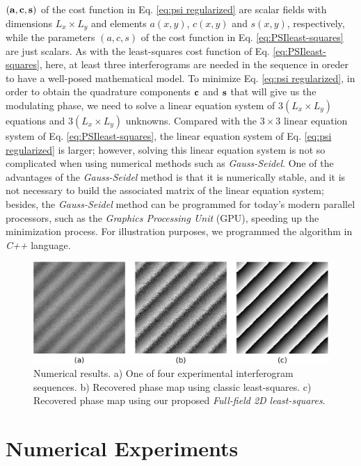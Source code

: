 $(\bf{a,c,s})$ of the cost function in Eq. \eqref{eq:psi regularized} are
scalar fields with dimensions $L_x\times L_y$ and elements $a(x,y)$,
$c(x,y)$ and $s(x,y)$, respectively, while the parameters
$(a,c,s)$ of the cost function in Eq. \eqref{eq:PSIleast-squares} are just scalars. As with the least-squares cost
function of Eq. \eqref{eq:PSIleast-squares}, here, at least three
interferograms are needed in the sequence in oreder to have a well-posed
mathematical model. To minimize Eq. \eqref{eq:psi regularized}, in
order to obtain the quadrature components $\bf c$ and $\bf s$ that
will give us the modulating phase, we need to solve a linear equation
system of $3(L_x\times L_y)$ equations and $3(L_x\times L_y)$
unknowns. Compared with the $3\times 3$ linear equation system of
Eq. \eqref{eq:PSIleast-squares}, the linear equation system of
Eq. \eqref{eq:psi regularized} is larger; however, solving this
linear equation system is not so complicated when using numerical
methods such as \emph{Gauss-Seidel}. One of the advantages of
the \emph{Gauss-Seidel} method is that it is numerically stable, and
it is not necessary to build the associated matrix of the linear
equation system; besides, the \emph{Gauss-Seidel} method can be
programmed for today's modern parallel processors, such as the
\emph{Graphics Processing Unit} (GPU), speeding up the minimization
process. For illustration purposes, we programmed the algorithm in
\emph{C++} language.
\begin{figure}[th!]
	\begin{center}
		\includegraphics[scale=0.25]{Chpt1_figures/Fig_1.eps}
	\end{center}
	\caption{Numerical results. a) One of four experimental 
	interferogram sequences. b) Recovered phase map using classic 
	least-squares. c) Recovered phase map using our proposed 
	\textit{Full-field 2D least-squares}.}
	\label{fig:SimPhaseComparison}
\end{figure}
\section{Numerical Experiments}


